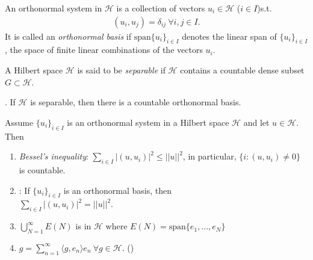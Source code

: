 \begin{definition}
    An orthonormal system in \(\mathcal{H}\) is a collection of vectors \(u_i\in \mathcal{H} \) (\(i\in I\))s.t.
    \begin{align*}
        (u_i,u_j) = \delta_{ij} \ \forall i,j\in I.
    \end{align*}
    It is called an \emph{orthonormal basis} if \(\text{span}\{u_i\}_{i\in I}\) denotes the linear span of \(\{u_i\}_{i\in I}\), the space of finite
    linear combinations of the vectors \(u_i\).
\end{definition}
\begin{definition}
    A Hilbert space \(\mathcal{H}\) is said to be \emph{separable} if \(\mathcal{H}\) contains a countable dense subset 
    \(G\subset\mathcal{H}\).
\end{definition}
\begin{theorem}
    . If \(\mathcal{H}\) is separable, then there is a countable orthonormal basis.
\end{theorem}
\begin{proposition}
    Assume \(\{u_i\}_{i\in I}\) is an orthonormal system in a Hilbert space \(\mathcal{H}\) and let \(u\in\mathcal{H}\). Then 
    \begin{enumerate}[label=(\roman*)]
        \item \emph{Bessel's inequality}: \(\sum_{i\in I} |(u,u_i)|^2\leq ||u||^2\), in particular, \(\{i:(u,u_i)\neq 0\}\) is countable.
        \item {}: If \(\{u_i\}_{i\in I }\) is an orthonormal basis, then \\ \(\sum_{i\in I} |(u,u_i)|^2 = ||u||^2\).
        \item \(\bigcup\limits_{N=1}^{\infty}E(N)\) is  in \(\mathcal{H}\) where \(E(N) = \text{span}\{e_1, ..., e_N\}\)
        \item \(g = \sum\limits_{n=1}^{\infty}\langle g, e_n\rangle e_n \ \forall g\in \mathcal{H}\). ()
    \end{enumerate}
\end{proposition}

